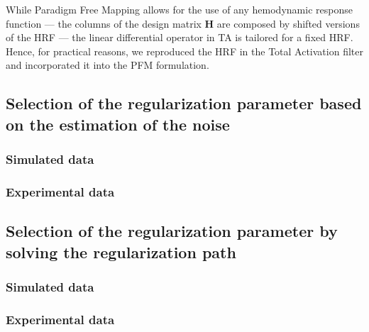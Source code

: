 While Paradigm Free Mapping allows for the use of any hemodynamic response function --- the columns of the design matrix \(\mathbf{H}\) are composed by shifted versions of the HRF --- the linear differential operator in TA is tailored for a fixed HRF. Hence, for practical reasons, we reproduced the HRF in the Total Activation filter and incorporated it into the PFM formulation.

\subsection{Selection of the regularization parameter based on the estimation of the noise}

\subsubsection{Simulated data}

\subsubsection{Experimental data}

\subsection{Selection of the regularization parameter by solving the regularization path}

\subsubsection{Simulated data}

\subsubsection{Experimental data}